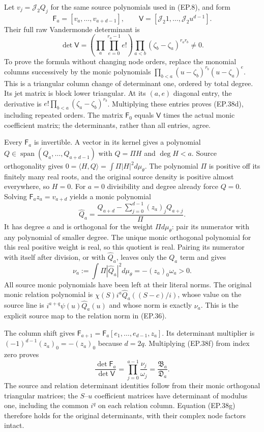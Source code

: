 \documentclass[11pt]{article}
\begin{document}
Let $v_j=\mathcal J_2Q_j$ for the same source polynomials used in
(EP.8), and form
\[
 \mathsf F_a=[v_a,\ldots,v_{a+d-1}],\qquad
 \mathsf V=[\mathcal J_2 1,\ldots,\mathcal J_2u^{d-1}].
\tag{EP.38c}
\]
Their full raw Vandermonde determinant is
\[
 \det\mathsf V=
 \left(\prod_a\prod_{e=0}^{r_a-1}e!\right)
 \prod_{a<b}(\zeta_b-\zeta_a)^{r_ar_b}\ne0.\tag{EP.38d}
\]
To prove the formula without changing node orders, replace the monomial
columns successively by the monic polynomials
$\prod_{b<a}(u-\zeta_b)^{r_b}(u-\zeta_a)^e$.
This is a triangular column change of determinant one, ordered by
total degree. Its jet matrix is block lower triangular. At its
$(a,e)$ diagonal entry, the derivative is
$e!\prod_{b<a}(\zeta_a-\zeta_b)^{r_b}$.
Multiplying these entries proves (EP.38d), including repeated orders.
The matrix $\mathsf F_0$ equals $\mathsf V$ times the actual monic
coefficient matrix; the determinants, rather than all entries, agree.

Every $\mathsf F_a$ is invertible. A vector in its kernel gives a
polynomial $Q\in\operatorname{span}(Q_a,\ldots,Q_{a+d-1})$
with $Q=\Pi H$ and $\deg H<a$. Source orthogonality gives
$0=\langle H,Q\rangle=\int\Pi|H|^2d\mu_\theta$.
The polynomial $\Pi$ is positive off its finitely many real roots,
and the original source density is positive almost everywhere, so
$H=0$. For $a=0$ divisibility and degree already
force $Q=0$. Solving $\mathsf F_a z_a=v_{a+d}$ yields a monic
polynomial
\[
 \widehat Q_a=
 \frac{Q_{a+d}-\sum_{j=0}^{d-1}(z_a)_jQ_{a+j}}{\Pi}.
\tag{EP.38e}
\]
It has degree $a$ and is orthogonal for the weight $\Pi d\mu_\theta$:
pair its numerator with any polynomial of smaller degree. The unique
monic orthogonal polynomial for this real positive weight is real,
so this quotient is real. Pairing its numerator with itself after
division, or with $\widehat Q_a$, leaves only the $Q_a$ term and gives
\[
 \nu_a:=\int\Pi|\widehat Q_a|^2d\mu_\theta
 =-(z_a)_0\omega_a>0.\tag{EP.38f}
\]
All source monic polynomials have been left at their literal norms.
The original monic relation polynomial is
$\chi(S)i^a\widehat Q_a((S-c)/i)$, whose value on the source line
is $i^{a+q}\psi(u)\widehat Q_a(u)$ and whose norm is exactly $\nu_a$.
This is the explicit source map to the relation norm in (EP.36).

The column shift gives
$\mathsf F_{a+1}=\mathsf F_a[e_1,\ldots,e_{d-1},z_a]$.
Its determinant multiplier is $(-1)^{d-1}(z_a)_0=-(z_a)_0$
because $d=2q$. Multiplying (EP.38f) from index zero proves
\[
 \boxed{\frac{\det\mathsf F_a}{\det\mathsf V}
 =\prod_{j=0}^{a-1}\frac{\nu_j}{\omega_j}
 =\frac{\mathfrak B_a}{\mathfrak D_a}.}\tag{EP.38g}
\]
The source and relation determinant identities follow from their
monic orthogonal triangular matrices; the $S$--$u$ coefficient
matrices have determinant of modulus one, including the common
$i^q$ on each relation column. Equation (EP.38g) therefore holds
for the original determinants, with their complex node factors intact.
\end{document}
